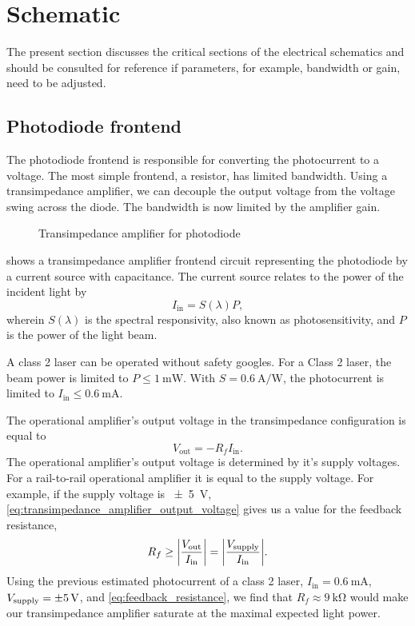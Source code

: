 \section{Schematic}

The present section discusses the critical sections of the electrical schematics and should be consulted for reference if parameters, for example, bandwidth or gain, need to be adjusted.

\subsection{Photodiode frontend}

The photodiode frontend is responsible for converting the photocurrent to a voltage.
The most simple frontend, a resistor, has limited bandwidth.
Using a transimpedance amplifier, we can decouple the output voltage from the voltage swing across the diode.
The bandwidth is now limited by the amplifier gain.

\begin{figure}[H]
	\centering
	
 	\caption{Transimpedance amplifier for photodiode}\label{fig:transimpedance_amplifier}
\end{figure}

 shows a transimpedance amplifier frontend circuit representing the photodiode by a current source with capacitance.
The current source relates to the power of the incident light by
\begin{equation}
I_\text{in} = S(\lambda) P,
\end{equation}
wherein $S(\lambda)$ is the spectral responsivity, also known as photosensitivity, and $P$ is the power of the light beam.

A class 2 laser can be operated without safety googles.
For a Class 2 laser, the beam power is limited to $P\leq\SI{1}{\milli\watt}$. With $S=\SI{0.6}{\ampere\per\watt}$, the photocurrent is limited to $I_\text{in}\leq\SI{0.6}{\milli\ampere}$.

The operational amplifier's output voltage in the transimpedance configuration is equal to
\begin{equation}
	V_\text{out} = - R_f I_\text{in}.
	\label{eq:transimpedance_amplifier_output_voltage}
\end{equation}
The operational amplifier's output voltage is determined by it's supply voltages.
For a rail-to-rail operational amplifier it is equal to the supply voltage.
For example, if the supply voltage is \SI{\pm5}{\volt}, \eqref{eq:transimpedance_amplifier_output_voltage} gives us a value for the feedback resistance,
\begin{equation}
	R_f\geq\abs{\frac{V_\text{out}}{I_\text{in}}}=\abs{\frac{V_\text{supply}}{I_\text{in}}}
	\label{eq:feedback_resistance}.
\end{equation}
Using the previous estimated photocurrent of a class 2 laser, $I_\text{in}=\SI{0.6}{\milli\ampere}$, $V_\text{supply}=\SI{\pm5}{\volt}$, and \eqref{eq:feedback_resistance}, we find that $R_f\approx\SI{9}{\kilo\ohm}$ would make our transimpedance amplifier saturate at the maximal expected light power.

